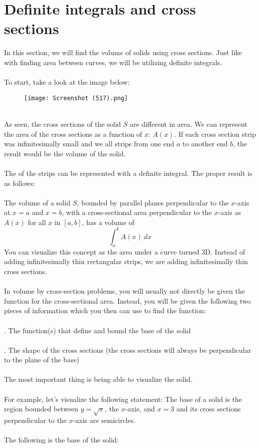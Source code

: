 \documentclass[11pt]{scrartcl}
\begin{document}
\maketitle
\noindent 

\section{Definite integrals and cross sections}
\noindent
In this section, we will find the volume of solids using cross sections. Just like with finding area between curves, we will be utilizing definite integrals.\\
\\
\noindent 
To start, take a look at the image below: 

\begin{figure}[htp]
    \centering
    \texttt{[image: Screenshot (517).png]}
\end{figure} \\
\noindent 
As seen, the cross sections of the solid $S$ are different in area. We can represent the area of the cross sections as a function of $x$: $A(x)$. If each cross section strip was infinitesimally small and we  all strips from one end $a$ to another end $b$, the result would be the volume of the solid. \\
\\
\noindent The  of the strips can be represented with a definite integral. The proper result is as follows: \\
\\
\noindent 
The volume of a solid $S$, bounded by parallel planes perpendicular to the $x$-axis at $x=a$ and $x=b$, with a cross-sectional area perpendicular to the $x$-axis as $A(x)$ for all $x$ in $[a,b]$, has a volume of 
$$\int_a^b {A(x) \ dx}$$
\noindent 
You can visualize this concept as the area under a curve turned 3D. Instead of adding infinitesimally thin rectangular strips, we are adding infinitesimally thin cross sections. \\
\\
\noindent 
In volume by cross-section problems, you will usually not directly be given the function for the cross-sectional area. Instead, you will be given the following two pieces of information which you then can use to find the function: \\
\\
. The function(s) that define and bound the base of the solid \\
\\
. The shape of the cross sections (the cross sections will always be perpendicular to the plane of the base)\\
\\
\noindent 
The most important thing is being able to visualize the solid.\\
\\
\noindent For example, let's visualize the following statement: The base of a solid is the region bounded between $y=\sqrt{x}$, the $x$-axis, and $x=3$ and its cross sections perpendicular to the $x$-axis are semicircles. \\
\\
\noindent 
The following is the base of the solid: 
\end{document}
